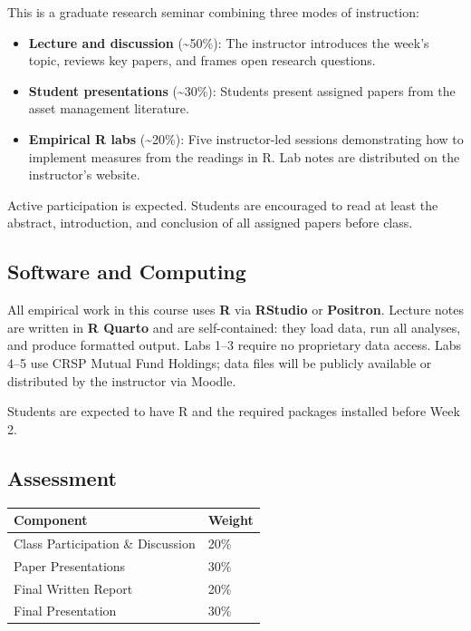 \documentclass[
  12pt,
  letterpaper,
  DIV=11,
  numbers=noendperiod]{scrartcl}
\newcounter{none} %
\providecommand{\tightlist}{%
  \setlength{\itemsep}{0pt}\setlength{\parskip}{0pt}}
\begin{document}
This is a graduate research seminar combining three modes of
instruction:

\begin{itemize}
\tightlist
\item
  \textbf{Lecture and discussion} (\textasciitilde50\%): The instructor
  introduces the week's topic, reviews key papers, and frames open
  research questions.
\item
  \textbf{Student presentations} (\textasciitilde30\%): Students present
  assigned papers from the asset management literature.
\item
  \textbf{Empirical R labs} (\textasciitilde20\%): Five instructor-led
  sessions demonstrating how to implement measures from the readings in
  R. Lab notes are distributed on the instructor's website.
\end{itemize}

Active participation is expected. Students are encouraged to read at
least the abstract, introduction, and conclusion of all assigned papers
before class.

\subsection{Software and Computing}\label{software-and-computing}

All empirical work in this course uses \textbf{R} via \textbf{RStudio}
or \textbf{Positron}. Lecture notes are written in \textbf{R Quarto} and
are self-contained: they load data, run all analyses, and produce
formatted output. Labs 1--3 require no proprietary data access. Labs
4--5 use CRSP Mutual Fund Holdings; data files will be publicly
available or distributed by the instructor via Moodle.

Students are expected to have R and the required packages installed
before Week 2.

\subsection{Assessment}\label{assessment}

{\def\LTcaptype{none} %
\begin{longtable}[]{@{}ll@{}}
\toprule\noalign{}
Component & Weight \\
\midrule\noalign{}
\endhead
\bottomrule\noalign{}
\endlastfoot
Class Participation \& Discussion & 20\% \\
Paper Presentations & 30\% \\
Final Written Report & 20\% \\
Final Presentation & 30\% \\
\end{longtable}
}
\end{document}
